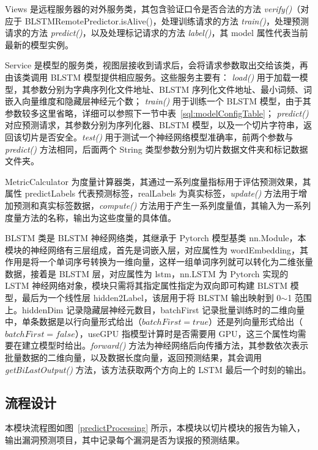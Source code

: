 Views 是远程服务器的对外服务类，其包含验证口令是否合法的方法 \textit{verify()}（对应于 BLSTMRemotePredictor.isAlive()，处理训练请求的方法 \textit{train()}，处理预测请求的方法 \textit{predict()}，以及处理标记请求的方法 \textit{label()}，其 model 属性代表当前最新的模型实例。

Service 是模型的服务类，视图层接收到请求后，会将请求参数取出交给该类，再由该类调用 BLSTM 模型提供相应服务。这些服务主要有： \textit{load()} 用于加载一模型，其参数分别为字典序列化文件地址、BLSTM 序列化文件地址、最小词频、词嵌入向量维度和隐藏层神经元个数； \textit{train()} 用于训练一个 BLSTM 模型，由于其参数较多这里省略，详细可以参照下一节中表~\ref{sql:modelConfigTable}； \textit{predict()} 对应预测请求，其参数分别为序列化器、BLSTM 模型，以及一个切片字符串，返回该切片是否安全。\textit{test()} 用于测试一个神经网络模型准确率，前两个参数与 \textit{predict()} 方法相同，后面两个 String 类型参数分别为切片数据文件夹和标记数据文件夹。

MetricCalculator 为度量计算器类，其通过一系列度量指标用于评估预测效果，其属性 predictLabels 代表预测标签，realLabels 为真实标签，\textit{update()} 方法用于增加预测和真实标签数据，\textit{compute()} 方法用于产生一系列度量值，其输入为一系列度量方法的名称，输出为这些度量的具体值。

BLSTM 类是 BLSTM 神经网络类，其继承于 Pytorch 模型基类 nn.Module，本模块的神经网络有三层组成，首先是词嵌入层，对应属性为 wordEmbedding，其作用是将一个单词序号转换为一维向量，这样一组单词序列就可以转化为二维张量数据，接着是 BLSTM 层，对应属性为 lstm，nn.LSTM 为 Pytorch 实现的 LSTM 神经网络对象，模块只需将其指定属性指定为双向即可构建 BLSTM 模型，最后为一个线性层 hidden2Label，该层用于将 BLSTM 输出映射到 0$\sim$1 范围上。hiddenDim 记录隐藏层神经元数目，batchFirst 记录批量训练时的二维向量中，单条数据是以行向量形式给出（$batchFirst=true$）还是列向量形式给出（$batchFirst=false$），useGPU 指模型计算时是否需要用 GPU，这三个属性均需要在建立模型时给出。\textit{forward()} 方法为神经网络后向传播方法，其参数依次表示批量数据的二维向量，以及数据长度向量，返回预测结果，其会调用 \textit{getBiLastOutput()} 方法，该方法获取两个方向上的 LSTM 最后一个时刻的输出。

\subsection{流程设计}

本模块流程图如图~\ref{predictProcessing} 所示，本模块以切片模块的报告为输入，输出漏洞预测项目，其中记录每个漏洞是否为误报的预测结果。

